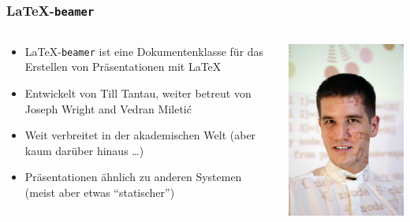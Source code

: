 \documentclass{cms-kurs}
\begin{document}
\begin{frame}
  \frametitle{\LaTeX{}-\texttt{beamer}}

  \onslide<+->

  \begin{columns}
    \begin{column}{0.7\linewidth}
      \begin{itemize}
      \item \LaTeX-\texttt{beamer} ist eine Dokumentenklasse für das Erstellen von
        Präsentationen mit \LaTeX
      \item Entwickelt von Till Tantau, weiter betreut von Joseph Wright and
        Vedran Miletić
      \item Weit verbreitet in der akademischen Welt (aber kaum darüber hinaus
        \dots)
      \item Präsentationen ähnlich zu anderen Systemen (meist aber etwas
        \enquote{statischer})
      \end{itemize}
    \end{column}
    \begin{column}{0.3\linewidth}
      \includegraphics[width=.9\linewidth,keepaspectratio]{img/till-tantau}
    \end{column}
  \end{columns}

\end{frame}
\end{document}
